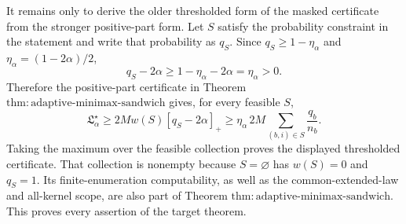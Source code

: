 It remains only to derive the older thresholded form of the masked certificate from the stronger positive-part form.  Let \(S\) satisfy the probability constraint in the statement and write that probability as \(q_S\).  Since \(q_S\ge1-\eta_\alpha\) and \(\eta_\alpha=(1-2\alpha)/2\),
\[
 q_S-2\alpha
 \ge1-\eta_\alpha-2\alpha
 =\eta_\alpha>0.
\]
Therefore the positive-part certificate in Theorem \(\mathrm{thm:adaptive\text{-}minimax\text{-}sandwich}\) gives, for every feasible \(S\),
\[
 \mathfrak L_\alpha^\star
 \ge2Mw(S)[q_S-2\alpha]_+
 \ge\eta_\alpha\,2M
 \sum_{(b,i)\in S}\frac{q_b}{n_b}.
\]
Taking the maximum over the feasible collection proves the displayed thresholded certificate.  That collection is nonempty because \(S=\varnothing\) has \(w(S)=0\) and \(q_S=1\).  Its finite-enumeration computability, as well as the common-extended-law and all-kernel scope, are also part of Theorem \(\mathrm{thm:adaptive\text{-}minimax\text{-}sandwich}\).  This proves every assertion of the target theorem.
